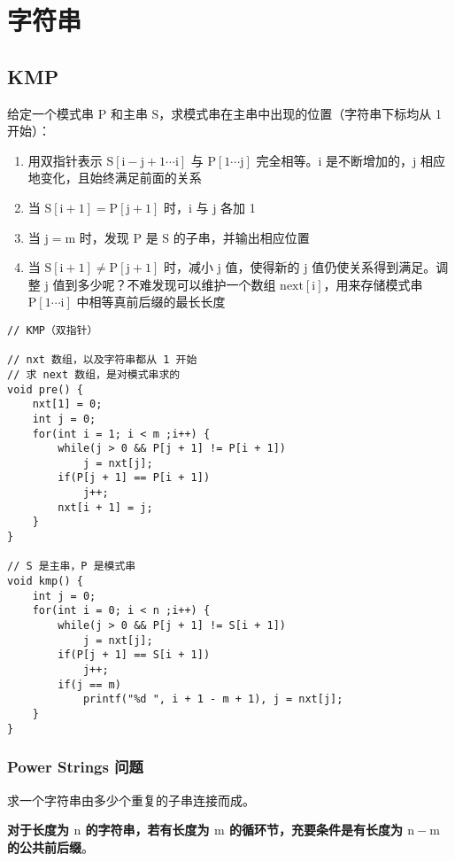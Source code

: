 \documentclass[UTF8]{article}
\begin{document}
\newpage
\section{字符串}

\subsection{KMP}
给定一个模式串 $\mathrm{P}$ 和主串 $\mathrm{S}$，求模式串在主串中出现的位置（字符串下标均从 1 开始）：

\begin{enumerate}
	\item 用双指针表示 $\mathrm{S[i-j+1\cdots i]}$ 与 $\mathrm{P[1 \cdots j]}$ 完全相等。$\mathrm{i}$ 是不断增加的，$\mathrm{j}$ 相应地变化，且始终满足前面的关系
	\item 当 $\mathrm{S[i+1] = P[j+1]}$ 时，$\mathrm{i}$ 与 $\mathrm{j}$ 各加 1
	\item 当 $\mathrm{j=m}$ 时，发现 $\mathrm{P}$ 是 $\mathrm{S}$ 的子串，并输出相应位置
	\item 当 $\mathrm{S[i + 1] \neq P[j+1]}$ 时，减小 $\mathrm{j}$ 值，使得新的 $\mathrm{j}$ 值仍使关系得到满足。调整 $\mathrm{j}$ 值到多少呢？不难发现可以维护一个数组 $\mathrm{next[i]}$，用来存储模式串 $\mathrm{P[1 \cdots i]}$ 中相等真前后缀的最长长度
\end{enumerate}

\begin{lstlisting}[caption=KMP]
// KMP（双指针）

// nxt 数组，以及字符串都从 1 开始
// 求 next 数组，是对模式串求的
void pre() {
	nxt[1] = 0;
	int j = 0;
	for(int i = 1; i < m ;i++) {
		while(j > 0 && P[j + 1] != P[i + 1])
			j = nxt[j];
		if(P[j + 1] == P[i + 1])
			j++;
		nxt[i + 1] = j; 
	}
}

// S 是主串，P 是模式串
void kmp() {
	int j = 0;
	for(int i = 0; i < n ;i++) {
		while(j > 0 && P[j + 1] != S[i + 1])
			j = nxt[j];
		if(P[j + 1] == S[i + 1])
			j++;
		if(j == m)
			printf("%d ", i + 1 - m + 1), j = nxt[j];
	}
}
\end{lstlisting}


\subsubsection{Power Strings 问题}
求一个字符串由多少个重复的子串连接而成。

\textbf{对于长度为 $\mathrm{n}$ 的字符串，若有长度为 $\mathrm{m}$ 的循环节，充要条件是有长度为 $\mathrm{n - m}$ 的公共前后缀}。
\end{document}

